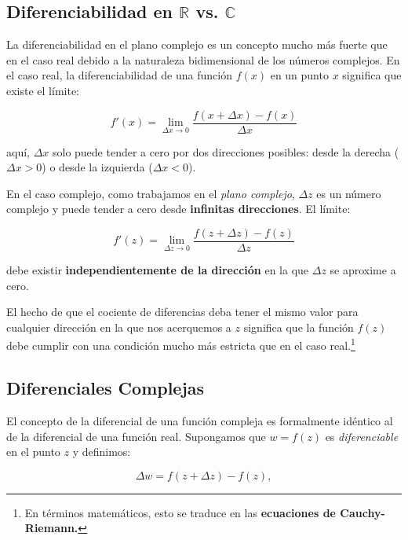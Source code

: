 \documentclass[10pt,a4paper]{book}
\begin{document}
\subsection{Diferenciabilidad en \( \mathbb{R} \) vs. \( \mathbb{C} \)}

La diferenciabilidad en el plano complejo es un concepto mucho más fuerte que en el caso real debido a la naturaleza bidimensional de los números complejos. En el caso real, la diferenciabilidad de una función $ f(x) $ en un punto $ x $ significa que existe el límite:

\begin{equation}
    f'(x) = \lim_{\Delta x \to 0} \frac{f(x + \Delta x) - f(x)}{\Delta x}
\end{equation}

aquí, $ \Delta x $ solo puede tender a cero por dos direcciones posibles: desde la derecha ($ \Delta x > 0 $) o desde la izquierda ($ \Delta x < 0 $).  

En el caso complejo, como trabajamos en el \textit{plano complejo}, $ \Delta z $ es un número complejo y puede tender a cero desde \textbf{infinitas direcciones}. El límite:

\begin{equation}
    f'(z) = \lim_{\Delta z \to 0} \frac{f(z + \Delta z) - f(z)}{\Delta z}
\end{equation}

debe existir \textbf{independientemente de la dirección} en la que $ \Delta z $ se aproxime a cero.  

El hecho de que el cociente de diferencias deba tener el mismo valor para cualquier dirección en la que nos acerquemos a $z$ significa que la función $f(z)$ debe cumplir con una condición mucho más estricta que en el caso real.\footnote{En términos matemáticos, esto se traduce en las \textbf{ecuaciones de Cauchy-Riemann.}}

\subsection{Diferenciales Complejas}

El concepto de la diferencial de una funci\'on compleja es formalmente id\'entico al de la diferencial de una funci\'on real. Supongamos que $ w = f(z) $ es \textit{diferenciable} en el punto $ z $ y definimos:

\begin{equation}
    \Delta w = f(z + \Delta z) - f(z),
\end{equation}
\end{document}
